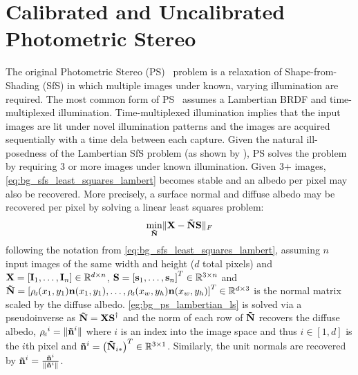 \section{Calibrated and Uncalibrated Photometric Stereo}\label{sec:bg_ps}
The original Photometric Stereo (PS)~\cite{woodham1980photometric} problem
is a relaxation of Shape-from-Shading (SfS) in which multiple images under
known, varying illumination are required. The most common form of
PS~\cite{woodham1980photometric} assumes a Lambertian BRDF and time-multiplexed
illumination. Time-multiplexed illumination implies that the input images
are lit under novel illumination patterns and the images are acquired
sequentially with a time dela between each capture. Given the natural
ill-posedness of the Lambertian SfS problem (as shown by
), PS solves the problem by requiring
3 or more images under known illumination. Given 3+ images,
\cref{eq:bg_sfs_least_squares_lambert} becomes stable and an albedo per pixel
may also be recovered. More precisely, a surface normal and diffuse albedo
may be recovered per pixel by solving a linear least squares problem:
\begin{equation}\label{eg:bg_ps_lambertian_ls}
	 \min_{\boldsymbol{\mathbf{\tilde{N}}}} \lVert \boldsymbol{\mathbf{X}} - \boldsymbol{\mathbf{\tilde{N}}} \boldsymbol{\mathbf{S}} \rVert_F
\end{equation}
following the notation from \cref{eq:bg_sfs_least_squares_lambert},
assuming $n$ input images of the same width and height ($d$ total pixels) and
$\boldsymbol{\mathbf{X}} = [\boldsymbol{\mathbf{I}}_1, \ldots, \boldsymbol{\mathbf{I}}_n] \in \mathbb{R}^{d \times n}$,
$\boldsymbol{\mathbf{S}} = {[\boldsymbol{\mathbf{s}}_1, \ldots, \boldsymbol{\mathbf{s}}_n]}^T \in \mathbb{R}^{3 \times n}$ and
$\bb{\tilde{N}} = \nobreak {[\rho_{\smallsub{d}}(x_1, y_1)\bb{n}(x_1, y_1), \ldots, \rho_{\smallsub{d}}(x_w, y_h)\bb{n}(x_w, y_h)]}^T \in \R^{d \times 3}$
is the normal matrix scaled by the diffuse
albedo. \cref{eg:bg_ps_lambertian_ls} is solved via a
pseudoinverse as $\boldsymbol{\mathbf{\tilde{N}}} = \boldsymbol{\mathbf{X}} \boldsymbol{\mathbf{S}}^{\dagger}$ and the norm of each
row of $\boldsymbol{\mathbf{\tilde{N}}}$ recovers the diffuse albedo,
${\rho_{\smallsub{d}}}^i = \norm{\bb{\tilde{n}}^i}$
where $i$ is an index into the image space and thus $i \in [1, d]$
is the $i$th pixel and
$\boldsymbol{\mathbf{\tilde{n}}}^i = {\left(\boldsymbol{\mathbf{\tilde{N}}}_{i\ast}\right)}^T \in \mathbb{R}^{3 \times 1}$.
Similarly, the unit normals are recovered by
$\boldsymbol{\mathbf{\tilde{n}}}^i = \frac{\boldsymbol{\mathbf{\tilde{n}}}^i}{\lVert{} \boldsymbol{\mathbf{\tilde{n}}}^i \rVert}$.
